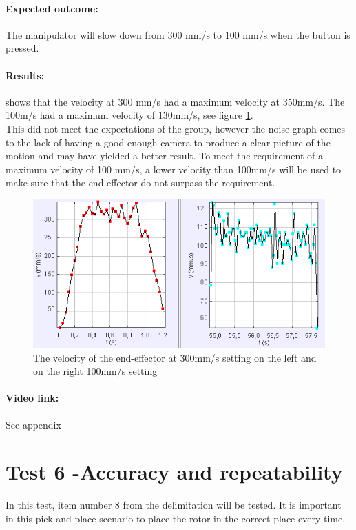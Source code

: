 \paragraph{Expected outcome:}
The manipulator will slow down from 300 mm/s to 100 mm/s when the button is pressed.

\paragraph{Results: }
shows that the velocity at 300 mm/s had a maximum velocity at 350mm/s. The 100m/s had a maximum velocity of 130mm/s, see figure \ref{fig:velocitytest}.\\
This did not meet the expectations of the group, however the noise graph comes to the lack of having a good enough camera to produce a clear picture of the motion and may have yielded a better result. To meet the requirement of a maximum velocity of 100 mm/s, a lower velocity than 100mm/s will be used to make sure that the end-effector do not surpass the requirement.\\ 

\begin{figure}[H]
  \centering
    \includegraphics[width=\textwidth]{Design/velcit.PNG}
    \caption{The velocity of the end-effector at 300mm/s setting on the left and on the right 100mm/s setting}  \label{fig:velocitytest}
\end{figure}

\paragraph{Video link: }
See appendix \cite{testfilm}

\section{Test 6 -Accuracy and repeatability}
In this test, item number 8 from the delimitation will be tested. It is important in this pick and place scenario to place the rotor in the correct place every time. 

